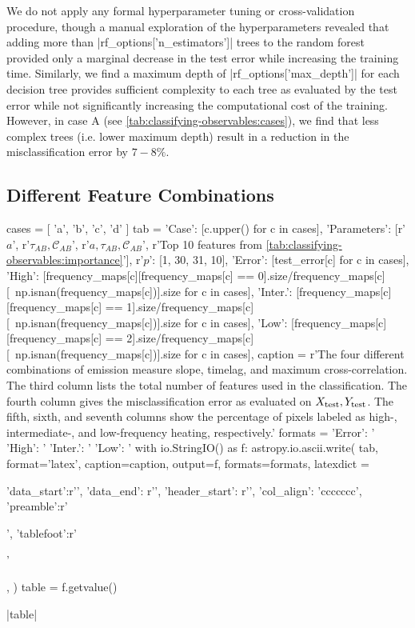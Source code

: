 We do not apply any formal hyperparameter tuning or cross-validation procedure, though a manual exploration of the hyperparameters revealed that adding more than |rf_options['n_estimators']| trees to the random forest provided only a marginal decrease in the test error while increasing the training time. Similarly, we find a maximum depth of |rf_options['max_depth']| for each decision tree provides sufficient complexity to each tree as evaluated by the test error while not significantly increasing the computational cost of the training. However, in case A (see \autoref{tab:classifying-observables:cases}), we find that less complex trees (i.e. lower maximum depth) result in a reduction in the misclassification error by $7-8\%$.

\subsection{Different Feature Combinations}\label{sec:classifying-observables:feature-combos}

\begin{pycode}
cases = [ 'a', 'b', 'c', 'd' ]
tab = {
    'Case': [c.upper() for c in cases],
    'Parameters': [r'$a$', r'$\tau_{AB},\mathcal{C}_{AB}$', r'$a,\tau_{AB},\mathcal{C}_{AB}$', r'Top 10 features from \autoref{tab:classifying-observables:importance}'],
    r'$p$': [1, 30, 31, 10],
    'Error': [test_error[c] for c in cases],
    'High': [frequency_maps[c][frequency_maps[c] == 0].size/frequency_maps[c][~np.isnan(frequency_maps[c])].size for c in cases],
    'Inter.': [frequency_maps[c][frequency_maps[c] == 1].size/frequency_maps[c][~np.isnan(frequency_maps[c])].size for c in cases],
    'Low': [frequency_maps[c][frequency_maps[c] == 2].size/frequency_maps[c][~np.isnan(frequency_maps[c])].size for c in cases],
}
caption = r'The four different combinations of emission measure slope, timelag, and maximum cross-correlation. The third column lists the total number of features used in the classification. The fourth column gives the misclassification error as evaluated on $X_\textup{test},Y_\textup{test}$. The fifth, sixth, and seventh columns show the percentage of pixels labeled as high-, intermediate-, and low-frequency heating, respectively.\label{tab:classifying-observables:cases}'
formats = {
    'Error': '%
    'High': '%
    'Inter.': '%
    'Low': '%
}
with io.StringIO() as f:
    astropy.io.ascii.write(
        tab,
        format='latex',
        caption=caption,
        output=f,
        formats=formats,
        latexdict = { 'data_start':r'\midrule', 'data_end': r'\bottomrule',
                      'header_start': r'\toprule', 'col_align': 'ccccccc',
                      'preamble':r'\begin{center}', 'tablefoot':r'\end{center}'},
    )
    table = f.getvalue()
\end{pycode}
|table|

